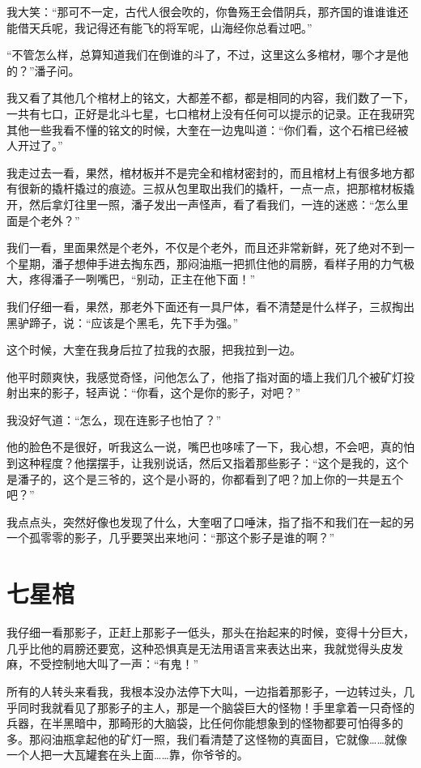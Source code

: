 我大笑：“那可不一定，古代人很会吹的，你鲁殇王会借阴兵，那齐国的谁谁谁还能借天兵呢，我记得还有能飞的将军呢，山海经你总看过吧。”

“不管怎么样，总算知道我们在倒谁的斗了，不过，这里这么多棺材，哪个才是他的？”潘子问。

我又看了其他几个棺材上的铭文，大都差不都，都是相同的内容，我们数了一下，一共有七口，正好是北斗七星，七口棺材上没有任何可以提示的记录。正在我研究其他一些我看不懂的铭文的时候，大奎在一边鬼叫道：“你们看，这个石棺已经被人开过了。”

我走过去一看，果然，棺材板并不是完全和棺材密封的，而且棺材上有很多地方都有很新的撬杆撬过的痕迹。三叔从包里取出我们的撬杆，一点一点，把那棺材板撬开，然后拿灯往里一照，潘子发出一声怪声，看了看我们，一连的迷惑：“怎么里面是个老外？”

我们一看，里面果然是个老外，不仅是个老外，而且还非常新鲜，死了绝对不到一个星期，潘子想伸手进去掏东西，那闷油瓶一把抓住他的肩膀，看样子用的力气极大，疼得潘子一咧嘴巴，“别动，正主在他下面！”

我们仔细一看，果然，那老外下面还有一具尸体，看不清楚是什么样子，三叔掏出黑驴蹄子，说：“应该是个黑毛，先下手为强。”

这个时候，大奎在我身后拉了拉我的衣服，把我拉到一边。

他平时颇爽快，我感觉奇怪，问他怎么了，他指了指对面的墙上我们几个被矿灯投射出来的影子，轻声说：“你看，这个是你的影子，对吧？”

我没好气道：“怎么，现在连影子也怕了？”

他的脸色不是很好，听我这么一说，嘴巴也哆嗦了一下，我心想，不会吧，真的怕到这种程度？他摆摆手，让我别说话，然后又指着那些影子：“这个是我的，这个是潘子的，这个是三爷的，这个是小哥的，你都看到了吧？加上你的一共是五个吧？”

我点点头，突然好像也发现了什么，大奎咽了口唾沫，指了指不和我们在一起的另一个孤零零的影子，几乎要哭出来地问：“那这个影子是谁的啊？”

\chapter{七星棺}

我仔细一看那影子，正赶上那影子一低头，那头在抬起来的时候，变得十分巨大，几乎比他的肩膀还要宽，这种恐惧真是无法用语言来表达出来，我就觉得头皮发麻，不受控制地大叫了一声：“有鬼！”

所有的人转头来看我，我根本没办法停下大叫，一边指着那影子，一边转过头，几乎同时我就看见了那影子的主人，那是一个脑袋巨大的怪物！手里拿着一只奇怪的兵器，在半黑暗中，那畸形的大脑袋，比任何你能想象到的怪物都要可怕得多的多。那闷油瓶拿起他的矿灯一照，我们看清楚了这怪物的真面目，它就像……就像一个人把一大瓦罐套在头上面……靠，你爷爷的。

